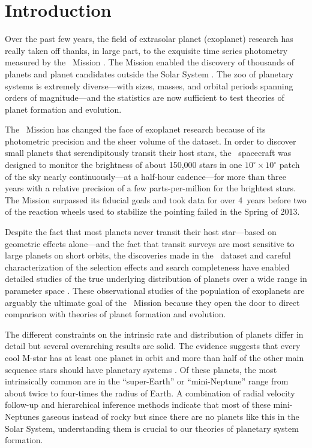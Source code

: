 \chapter*{Introduction}

Over the past few years, the field of extrasolar planet (exoplanet) research
has really taken off thanks, in large part, to the exquisite time series
photometry measured by the \kepler\ Mission \citep{Borucki:2010}.
The Mission enabled the discovery of thousands of planets and planet
candidates outside the Solar System \citep{Rowe:2015}.
The zoo of planetary systems is extremely diverse---with sizes, masses, and
orbital periods spanning orders of magnitude---and the statistics are now
sufficient to test theories of planet formation and evolution.

The \kepler\ Mission has changed the face of exoplanet research because of its
photometric precision and the sheer volume of the dataset.
In order to discover small planets that serendipitously transit their host
stars, the \kepler\ spacecraft was designed to monitor the brightness of about
150,000 stars in one $10^\circ \times 10^\circ$ patch of the sky nearly
continuously---at a half-hour cadence---for more than three years with a
relative precision of a few parts-per-million for the brightest stars.
The Mission surpassed its fiducial goals and took data for over 4~years before
two of the reaction wheels used to stabilize the pointing failed in the Spring
of 2013.

Despite the fact that most planets never transit their host star---based on
geometric effects alone---and the fact that transit surveys are most sensitive
to large planets on short orbits, the discoveries made in the \kepler\ dataset
and careful characterization of the selection effects and search completeness
have enabled detailed studies of the true underlying distribution of planets
over a wide range in parameter space \citep[examples include][and
]{Howard:2012, Petigura:2013, Foreman-Mackey:2014,
Dressing:2015}.
These observational studies of the population of exoplanets are arguably the
ultimate goal of the \kepler\ Mission because they open the door to direct
comparison with theories of planet formation and evolution.

The different constraints on the intrinsic rate and distribution of planets
differ in detail but several overarching results are solid.
The evidence suggests that every cool M-star has at least one planet in orbit
\citep{Dressing:2013, Dressing:2015} and more than half of the other main
sequence stars should have planetary systems \citep{Howard:2012, Fressin:2013,
Petigura:2013, Foreman-Mackey:2014}.
Of these planets, the most intrinsically common are in the ``super-Earth'' or
``mini-Neptune'' range from about twice to four-times the radius of Earth.
A combination of radial velocity follow-up and hierarchical inference methods
indicate that most of these mini-Neptunes gaseous instead of rocky
\citep{Weiss:2014, Rogers:2015} but since there are no planets like this in
the Solar System, understanding them is crucial to our theories of planetary
system formation.

